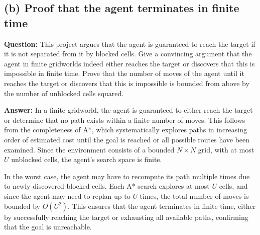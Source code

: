 \documentclass{article}
\begin{document}
\subsection{(b) Proof that the agent terminates in finite time}

\textbf{Question:} This project argues that the agent is guaranteed to reach the target if it is not separated from it by blocked cells. Give a convincing argument that the agent in finite gridworlds indeed either reaches the target or discovers that this is impossible in finite time. Prove that the number of moves of the agent until it reaches the target or discovers that this is impossible is bounded from above by the number of unblocked cells squared.


\textbf{Answer:}  
In a finite gridworld, the agent is guaranteed to either reach the target or determine that no path exists within a finite number of moves. This follows from the completeness of A*, which systematically explores paths in increasing order of estimated cost until the goal is reached or all possible routes have been examined. Since the environment consists of a bounded \( N \times N \) grid, with at most \( U \) unblocked cells, the agent’s search space is finite. 

In the worst case, the agent may have to recompute its path multiple times due to newly discovered blocked cells. Each A* search explores at most \( U \) cells, and since the agent may need to replan up to \( U \) times, the total number of moves is bounded by \( O(U^2) \). This ensures that the agent terminates in finite time, either by successfully reaching the target or exhausting all available paths, confirming that the goal is unreachable.
\end{document}
